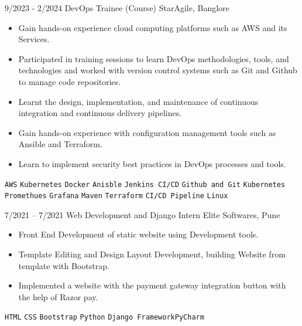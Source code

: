 \documentclass[9pt]{developercv} %
\begin{document}
\vspace{-10 pt}
\begin{entrylist}
    \entry
        {9/2023 - 2/2024}
		{DevOps Trainee (Course)}
		{StarAgile, Banglore}
		{\vspace{-10pt}
        \begin{itemize}[noitemsep,topsep=0pt,parsep=0pt,partopsep=0pt, leftmargin=-1pt]
            \item Gain hands-on experience cloud computing platforms such as AWS and its Services.
            \item Participated in training sessions to learn DevOps methodologies, tools, and technologies and worked with version control systems 
                  such as Git and Github to manage code repositories.
            \item Learnt the design, implementation, and maintenance of continuous integration and continuous delivery pipelines.
            \item Gain hands-on experience with configuration management tools such as Ansible and Terraform.
            \item Learn to implement security best practices in DevOps processes and tools.
        \end{itemize} 
        \texttt{AWS} \slashsep \texttt{Kubernetes} \slashsep \texttt{Docker} \slashsep \texttt{Anisble} \slashsep \texttt{Jenkins CI/CD} \slashsep \texttt{Github and Git} \slashsep \texttt{Kubernetes} \slashsep \texttt{Promethues} \slashsep \texttt{Grafana} \slashsep \texttt{Maven} \slashsep \texttt{Terraform} \slashsep \texttt{CI/CD Pipeline} \slashsep \texttt{Linux}}
	\entry
        {7/2021 -- 7/2021}
		{Web Development and Django Intern}
		{Elite Softwares, Pune}
		{\vspace{-10pt}
        \begin{itemize}[noitemsep,topsep=0pt,parsep=0pt,partopsep=0pt, leftmargin=-1pt]
            \item Front End Development of static website using Development tools.
            \item Template Editing and Design Layout Development, building Website from template with Bootstrap.
            \item Implemented a website with the payment gateway integration button with the help of Razor pay.
        \end{itemize} 
        \texttt{HTML} \slashsep \texttt{CSS} \slashsep \texttt{Bootstrap} \slashsep \texttt{Python} \slashsep \texttt{Django Framework}\slashsep \texttt{PyCharm}}
\end{entrylist}
\end{document}
